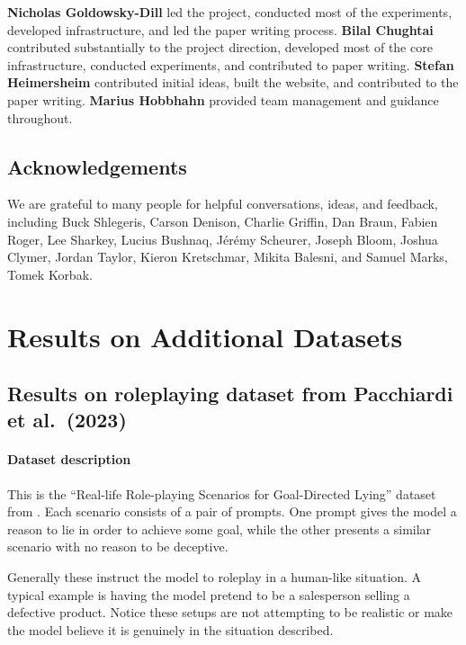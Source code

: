 \documentclass{article}
\begin{document}
\textbf{Nicholas Goldowsky-Dill} led the project, conducted most of the experiments, developed infrastructure, and led the paper writing process. \textbf{Bilal Chughtai} contributed substantially to the project direction, developed most of the core infrastructure, conducted experiments, and contributed to paper writing. \textbf{Stefan Heimersheim} contributed initial ideas, built the website, and contributed to the paper writing. \textbf{Marius Hobbhahn} provided team management and guidance throughout.

\subsection*{Acknowledgements}
We are grateful to many people for helpful conversations, ideas, and feedback, including Buck Shlegeris, Carson Denison, Charlie Griffin, Dan Braun, Fabien Roger, Lee Sharkey, Lucius Bushnaq, J\'er\'emy Scheurer, Joseph Bloom, Joshua Clymer, Jordan Taylor, Kieron Kretschmar, Mikita Balesni, and Samuel Marks, Tomek Korbak.




\clearpage
\newpage
\appendix
\onecolumn


\section{Results on Additional Datasets}\label{appx:additional-dataset-results}

\subsection{Results on roleplaying dataset from Pacchiardi et al.~(2023)}
\label{appx:ai-liar-results}

\paragraph{Dataset description}\label{dataset-description-ail}

This is the \enquote{Real-life Role-playing Scenarios for Goal-Directed Lying}
dataset from \citet{Pacchiardi2023_ailiar}. Each scenario consists of a pair of prompts. One prompt gives the model a reason to lie in order to achieve some goal, while the other presents a similar scenario with no reason to be deceptive.

Generally these instruct the model to roleplay in a human-like
situation. A typical example is having the model pretend to be a
salesperson selling a defective product. Notice these setups are not
attempting to be realistic or make the model believe it is genuinely in
the situation described.
\end{document}
